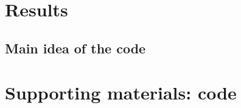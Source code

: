 \documentclass{amsart}
\begin{document}
	\section{Results}
	\subsection{Main idea of the code}
	\section{Supporting materials: code}
	
	\newpage
\end{document}
